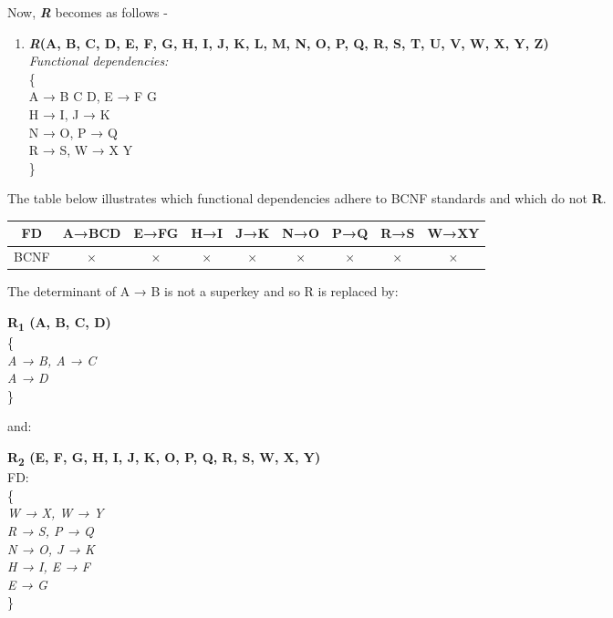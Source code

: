 Now, \textbf{\emph{R}} becomes as follows -\\
\begin{enumerate}
\item \textbf{\emph{R}(A, B, C, D, E, F, G, H, I, J, K, L, M, N, O, P, Q, R, S, T, U, V, W, X, Y, Z)}\\
\textit{Functional dependencies:}\\
\{\\
\hspace{1cm} A → B C D, E → F G\\
\hspace{1cm} H → I, J → K\\
\hspace{1cm} N → O, P → Q\\
\hspace{1cm} R → S, W → X Y\\
\}
\end{enumerate}

The table below illustrates which functional dependencies adhere to BCNF standards and which do not \textbf{R}.


\begin{center}
\begin{tabular}{ |c|c|c|c|c|c|c|c|c| }
\hline
 FD&A→BCD&E→FG&H→I&J→K&N→O&P→Q&R→S&W→XY\\ 
\hline
BCNF&$\times$&$\times$&$\times$&$\times$&$\times$&$\times$&$\times$&$\times$ \\ \hline
\end{tabular}
\end{center}

The determinant of A → B is not a superkey and so R is replaced by:\\

\begin{adjustwidth}{2cm}{}
\textbf{R\textsubscript{1} (A, B, C, D)}\\
\{\\ 
\textit{
A → B, A → C\\
A → D\\
} 
\}\\
\end{adjustwidth} 
and:\\ 

\begin{adjustwidth}{2cm}{}
\textbf{R\textsubscript{2} (E, F, G, H, I, J, K, O, P, Q, R, S, W, X, Y)}\\
FD:\\ 
\{ \\ 
\textit{
W → X, W → Y\\
R → S, P → Q\\
N → O, J → K\\
H → I, E → F\\
E → G\\
}
\}\\ \\
\end{adjustwidth} 


